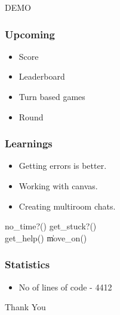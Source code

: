 \documentclass{beamer}
\begin{document}
\begin{frame}
    \begin{center}
       \large{DEMO}
    \end{center}
\end{frame}

\begin{frame}
    \frametitle{Upcoming}
    \begin{itemize}
        \item Score
        \vspace{1 mm}
        \item Leaderboard
        \vspace{1 mm}
        \item Turn based games
        \vspace{1 mm}
        \item Round
    \end{itemize}
\end{frame}

\begin{frame}
    \frametitle{Learnings}
    \begin{itemize}
    \item Getting errors is better.
    \vspace{1 mm}
    \item Working with canvas.
    \vspace{1 mm}
    \item Creating multiroom chats.
    \end{itemize}
    
     no\_time?()  get\_stuck?()  \\
    \hspace{0.5 cm} get\_help() \|  move\_on() \\

\end{frame}
\begin{frame}
    \frametitle{Statistics}
    \begin{itemize}
    \item No of lines of code - 4412
    \end{itemize}

\end{frame}    

\begin{frame}
    \begin{center}
       \large{Thank You}
    \end{center}
\end{frame}
\end{document}
